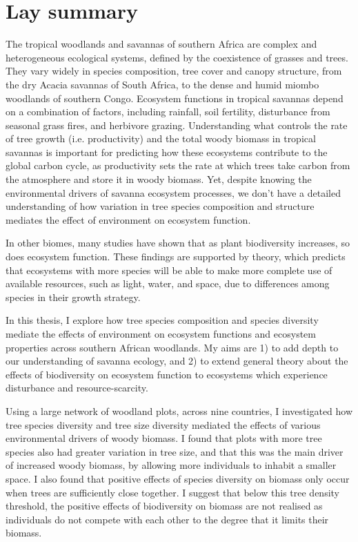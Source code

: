 \chapter*{Lay summary}
\label{lay}

The tropical woodlands and savannas of southern Africa are complex and heterogeneous ecological systems, defined by the coexistence of grasses and trees. They vary widely in species composition, tree cover and canopy structure, from the dry Acacia savannas of South Africa, to the dense and humid miombo woodlands of southern Congo. Ecosystem functions in tropical savannas depend on a combination of factors, including rainfall, soil fertility, disturbance from seasonal grass fires, and herbivore grazing. Understanding what controls the rate of tree growth (i.e. productivity) and the total woody biomass in tropical savannas is important for predicting how these ecosystems contribute to the global carbon cycle, as productivity sets the rate at which trees take carbon from the atmosphere and store it in woody biomass. Yet, despite knowing the environmental drivers of savanna ecosystem processes, we don't have a detailed understanding of how variation in tree species composition and structure mediates the effect of environment on ecosystem function. 

In other biomes, many studies have shown that as plant biodiversity increases, so does ecosystem function. These findings are supported by theory, which predicts that ecosystems with more species will be able to make more complete use of available resources, such as light, water, and space, due to differences among species in their growth strategy. 

In this thesis, I explore how tree species composition and species diversity mediate the effects of environment on ecosystem functions and ecosystem properties across southern African woodlands. My aims are 1) to add depth to our understanding of savanna ecology, and 2) to extend general theory about the effects of biodiversity on ecosystem function to ecosystems which experience disturbance and resource-scarcity. 

Using a large network of woodland plots, across nine countries, I investigated how tree species diversity and tree size diversity mediated the effects of various environmental drivers of woody biomass. I found that plots with more tree species also had greater variation in tree size, and that this was the main driver of increased woody biomass, by allowing more individuals to inhabit a smaller space. I also found that positive effects of species diversity on biomass only occur when trees are sufficiently close together. I suggest that below this tree density threshold, the positive effects of biodiversity on biomass are not realised as individuals do not compete with each other to the degree that it limits their biomass.

